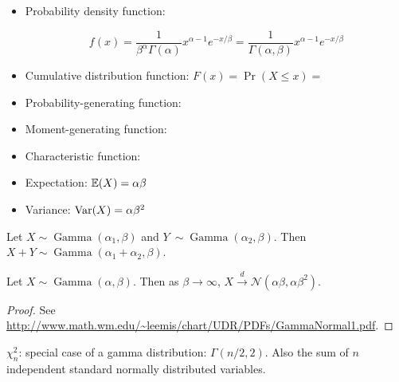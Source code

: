 \begin{itemize}

\item Probability density function: 

\[
f(x)  = \frac{1}{\beta^\alpha\Gamma(\alpha)} x^{\alpha - 1} e^{-x/\beta} = \frac{1}{\Gamma(\alpha, \beta)} x^{\alpha - 1} e^{-x/\beta}
\]

\item Cumulative distribution function: \(F(x) = \Pr(X \leq x) = \)

\item Probability-generating function:

\item Moment-generating function:

\item Characteristic function:

\item Expectation: \(\E(X) = \alpha \beta \)

\item Variance: \(\Var(X) = \alpha \beta^2 \)

\end{itemize}

\begin{proposition}\label{prob.gammasum}Let \(X \sim \operatorname{Gamma}(\alpha_1, \beta)\) and \(Y\ \sim \operatorname{Gamma}(\alpha_2, \beta)\). Then \(X + Y \sim \operatorname{Gamma}(\alpha_1 + \alpha_2, \beta)\). 
\end{proposition}

\begin{proposition}\label{prob.gamma.to.normal}Let \(X \sim \operatorname{Gamma}(\alpha, \beta)\). Then as \(\beta \to \infty\), \(X \xrightarrow{d} \mathcal{N}(\alpha \beta, \alpha \beta^2)\). 

\end{proposition}

\begin{proof}See \url{http://www.math.wm.edu/~leemis/chart/UDR/PDFs/GammaNormal1.pdf}.
\end{proof}

\textbf{\(\chi_n^2\)}: special case of a gamma distribution: \(\Gamma(n/2, 2)\). Also the sum of \(n\) independent standard normally distributed variables.

